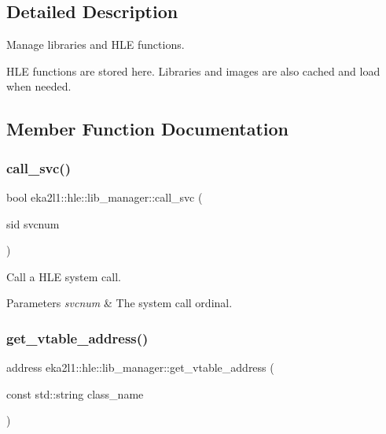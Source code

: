 \subsection{Detailed Description}
Manage libraries and H\+LE functions. 

H\+LE functions are stored here. Libraries and images are also cached and load when needed. 

\subsection{Member Function Documentation}
\mbox{\label{classeka2l1_1_1hle_1_1lib__manager_a8567be4292de6f27126064dd61b823fa}} 
\subsubsection{\texorpdfstring{call\+\_\+svc()}{call\_svc()}}
{\footnotesize\ttfamily bool eka2l1\+::hle\+::lib\+\_\+manager\+::call\+\_\+svc (\begin{DoxyParamCaption}\item[{sid}]{svcnum }\end{DoxyParamCaption})}



Call a H\+LE system call. 


\begin{DoxyParams}{Parameters}
{\em svcnum} & The system call ordinal. \\
\hline
\end{DoxyParams}
\mbox{\label{classeka2l1_1_1hle_1_1lib__manager_a2960c07d66c61b5db35647a49663fb51}} 
\subsubsection{\texorpdfstring{get\+\_\+vtable\+\_\+address()}{get\_vtable\_address()}}
{\footnotesize\ttfamily address eka2l1\+::hle\+::lib\+\_\+manager\+::get\+\_\+vtable\+\_\+address (\begin{DoxyParamCaption}\item[{const std\+::string}]{class\+\_\+name }\end{DoxyParamCaption})}



